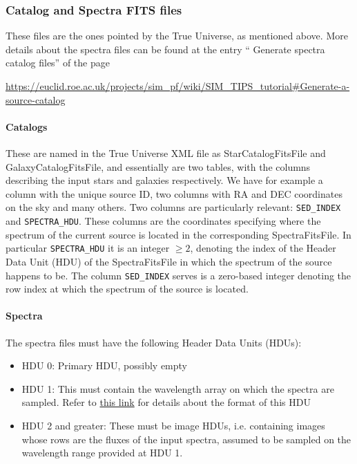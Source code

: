 \subsubsection{Catalog and Spectra FITS files}

These files are the ones pointed by the True Universe, as mentioned above. More details about the spectra files can be found at the entry `` Generate spectra catalog files'' of the page

\begin{center}
\hypertarget{url:spectra_file_redmine}{\url{https://euclid.roe.ac.uk/projects/sim_pf/wiki/SIM_TIPS_tutorial#Generate-a-source-catalog}}
\end{center}

\paragraph{Catalogs}
These are named in the True Universe XML file as StarCatalogFitsFile and GalaxyCatalogFitsFile, and essentially are two tables, with the columns describing the input stars and galaxies respectively. We have for example a column with the unique source ID, two columns with RA and DEC coordinates on the sky and many others. Two columns are particularly relevant: \verb+SED_INDEX+ and \verb+SPECTRA_HDU+. These columns are the coordinates specifying where the spectrum of the current source is located in the corresponding SpectraFitsFile. In particular \verb+SPECTRA_HDU+ it is an integer $\geq 2$, denoting the index of the Header Data Unit (HDU) of the SpectraFitsFile in which the spectrum of the source happens to be. The column \verb+SED_INDEX+ serves is a zero-based integer denoting the row index at which the spectrum of the source is located. 

\paragraph{Spectra}

The spectra files must have the following Header Data Units (HDUs):
\begin{itemize}
\item HDU 0: Primary HDU, possibly empty
\item HDU 1: This must contain the wavelength array on which the spectra are sampled. Refer to \hyperlink{url:spectra_file_redmine}{this link} for details about the format of this HDU
\item HDU 2 and greater: These must be image HDUs, i.e. containing images whose rows are the fluxes of the input spectra, assumed to be sampled on the wavelength range provided at HDU 1.
\end{itemize}
